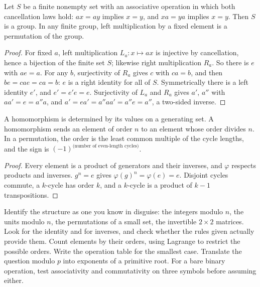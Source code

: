 \begin{proposition}
Let $S$ be a finite nonempty set with an associative operation in which both cancellation laws hold: $ax=ay$ implies $x=y$, and $xa=ya$ implies $x=y$. Then $S$ is a group. In any finite group, left multiplication by a fixed element is a permutation of the group.
\end{proposition}

\begin{proof}
For fixed $a$, left multiplication $L_a\colon x\mapsto ax$ is injective by cancellation, hence a bijection of the finite set $S$; likewise right multiplication $R_a$. So there is $e$ with $ae=a$. For any $b$, surjectivity of $R_a$ gives $c$ with $ca=b$, and then $be=cae=ca=b$: $e$ is a right identity for all of $S$. Symmetrically there is a left identity $e'$, and $e'=e'e=e$. Surjectivity of $L_a$ and $R_a$ gives $a'$, $a''$ with $aa'=e=a''a$, and $a'=ea'=a''aa'=a''e=a''$, a two-sided inverse.
\end{proof}

\begin{proposition}
A homomorphism is determined by its values on a generating set. A homomorphism sends an element of order $n$ to an element whose order divides $n$. In a permutation, the order is the least common multiple of the cycle lengths, and the sign is $(-1)^{\text{(number of even-length cycles)}}$.
\end{proposition}

\begin{proof}
Every element is a product of generators and their inverses, and $\varphi$ respects products and inverses. $g^n=e$ gives $\varphi(g)^n=\varphi(e)=e$. Disjoint cycles commute, a $k$-cycle has order $k$, and a $k$-cycle is a product of $k-1$ transpositions.
\end{proof}

\begin{firstmoves}
Identify the structure as one you know in disguise: the integers modulo $n$, the units modulo $n$, the permutations of a small set, the invertible $2\times2$ matrices. Look for the identity and for inverses, and check whether the rules given actually provide them. Count elements by their orders, using Lagrange to restrict the possible orders. Write the operation table for the smallest case. Translate the question modulo $p$ into exponents of a primitive root. For a bare binary operation, test associativity and commutativity on three symbols before assuming either.
\end{firstmoves}

